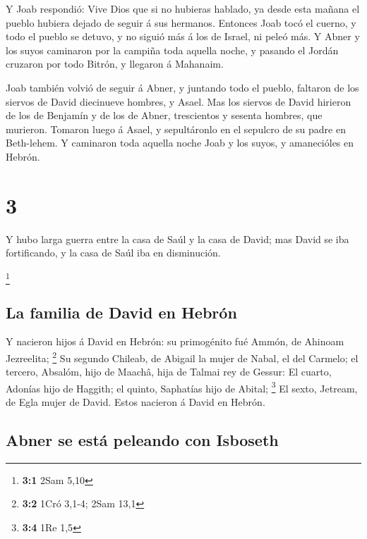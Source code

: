  Y Joab respondió: Vive Dios que si no hubieras hablado, ya
desde esta mañana el pueblo hubiera dejado de seguir á sus hermanos.
 Entonces Joab tocó el cuerno, y todo el pueblo se detuvo,
y no siguió más á los de Israel, ni peleó más.  Y Abner y
los suyos caminaron por la campiña toda aquella noche, y pasando el
Jordán cruzaron por todo Bitrón, y llegaron á Mahanaim.

 Joab también volvió de seguir á Abner, y juntando todo el
pueblo, faltaron de los siervos de David diecinueve hombres, y Asael.
 Mas los siervos de David hirieron de los de Benjamín y de
los de Abner, trescientos y sesenta hombres, que murieron. Tomaron luego
á Asael, y sepultáronlo en el sepulcro de su padre en Beth-lehem.
 Y caminaron toda aquella noche Joab y los suyos, y
amanecióles en Hebrón.

\hypertarget{section-2}{%
\section{3}\label{section-2}}

 Y hubo larga guerra entre la casa de Saúl y la casa de
David; mas David se iba fortificando, y la casa de Saúl iba en
disminución.

\footnote{\textbf{3:1} 2Sam 5,10}

\hypertarget{la-familia-de-david-en-hebruxf3n}{%
\subsection{La familia de David en
Hebrón}\label{la-familia-de-david-en-hebruxf3n}}

 Y nacieron hijos á David en Hebrón: su primogénito fué
Ammón, de Ahinoam Jezreelita; \footnote{\textbf{3:2} 1Cró 3,1-4; 2Sam
  13,1}  Su segundo Chileab, de Abigail la mujer de Nabal,
el del Carmelo; el tercero, Absalóm, hijo de Maachâ, hija de Talmai rey
de Gessur:  El cuarto, Adonías hijo de Haggith; el quinto,
Saphatías hijo de Abital; \footnote{\textbf{3:4} 1Re 1,5} 
El sexto, Jetream, de Egla mujer de David. Estos nacieron á David en
Hebrón.

\hypertarget{abner-se-estuxe1-peleando-con-isboseth}{%
\subsection{Abner se está peleando con
Isboseth}\label{abner-se-estuxe1-peleando-con-isboseth}}

